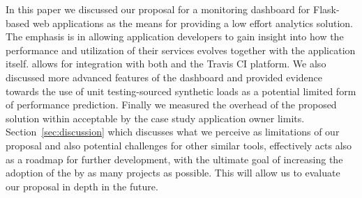 \documentclass[conference]{IEEEtran}
\begin{document}
In this paper we discussed our proposal for a monitoring dashboard for Flask-based web applications as the means for providing a low effort analytics solution. The emphasis is in allowing application developers to gain insight into how the performance and utilization of their services evolves together with the application itself. \tool allows for integration with both \git and the Travis CI platform. We also discussed more advanced features of the dashboard and provided evidence towards the use of unit testing-sourced synthetic loads as a potential limited form of performance prediction. Finally we measured the overhead of the proposed solution within acceptable by the case study application owner limits. Section~\ref{sec:discussion} which discusses what we perceive as limitations of our proposal and also potential challenges for other similar tools, effectively acts also as a roadmap for further development, with the ultimate goal of increasing the adoption of the \tool by as many projects as possible. This will allow us to evaluate our proposal in depth in the future.


%
%



% 



\newpage




\end{document}
